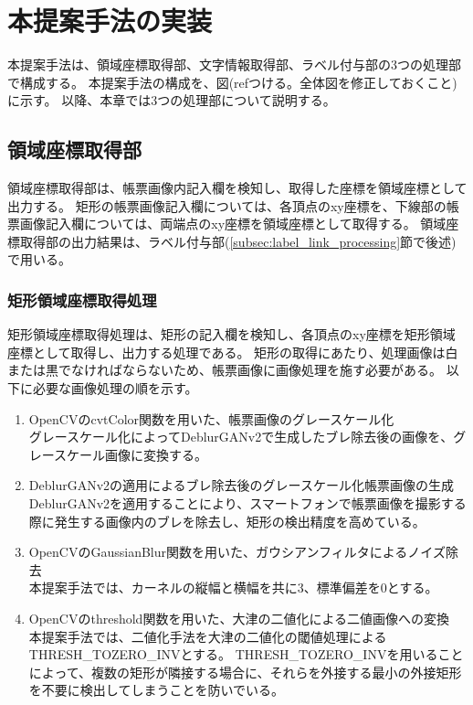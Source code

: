 \chapter{本提案手法の実装}\label{cha:Implementation}
本提案手法は、領域座標取得部、文字情報取得部、ラベル付与部の3つの処理部で構成する。
本提案手法の構成を、図(refつける。全体図を修正しておくこと)に示す。
以降、本章では3つの処理部について説明する。


\section{領域座標取得部}\label{sec:area_coords_obtainment_part}
領域座標取得部は、帳票画像内記入欄を検知し、取得した座標を領域座標として出力する。
矩形の帳票画像記入欄については、各頂点のxy座標を、下線部の帳票画像記入欄については、両端点のxy座標を領域座標として取得する。
領域座標取得部の出力結果は、ラベル付与部(\ref{subsec:label_link_processing}節で後述)で用いる。


\subsection{矩形領域座標取得処理}\label{subsec:rect_coords_obtainment_processing}
矩形領域座標取得処理は、矩形の記入欄を検知し、各頂点のxy座標を矩形領域座標として取得し、出力する処理である。
矩形の取得にあたり、処理画像は白または黒でなければならないため、帳票画像に画像処理を施す必要がある。
以下に必要な画像処理の順を示す。

\begin{enumerate}
    \item OpenCVのcvtColor関数を用いた、帳票画像のグレースケール化\\
        グレースケール化によってDeblurGANv2で生成したブレ除去後の画像を、グレースケール画像に変換する。
    \item DeblurGANv2の適用によるブレ除去後のグレースケール化帳票画像の生成\\
        DeblurGANv2を適用することにより、スマートフォンで帳票画像を撮影する際に発生する画像内のブレを除去し、矩形の検出精度を高めている。
    \item OpenCVのGaussianBlur関数を用いた、ガウシアンフィルタによるノイズ除去\\
        本提案手法では、カーネルの縦幅と横幅を共に3、標準偏差を0とする。
    \item OpenCVのthreshold関数を用いた、大津の二値化による二値画像への変換\\
        本提案手法では、二値化手法を大津の二値化の閾値処理によるTHRESH\_TOZERO\_INVとする。
        THRESH\_TOZERO\_INVを用いることによって、複数の矩形が隣接する場合に、それらを外接する最小の外接矩形を不要に検出してしまうことを防いでいる。
\end{enumerate}

